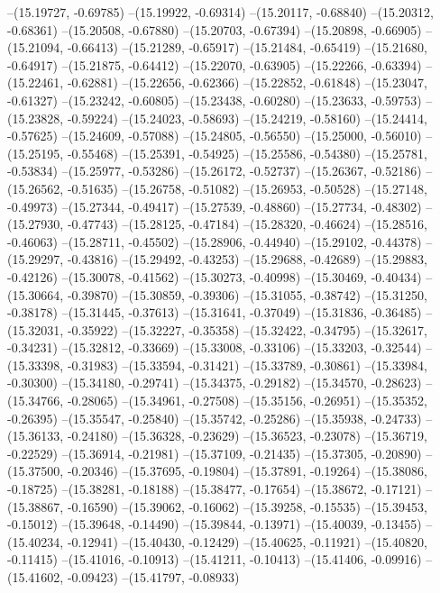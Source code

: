 --(15.19727, -0.69785)
--(15.19922, -0.69314)
--(15.20117, -0.68840)
--(15.20312, -0.68361)
--(15.20508, -0.67880)
--(15.20703, -0.67394)
--(15.20898, -0.66905)
--(15.21094, -0.66413)
--(15.21289, -0.65917)
--(15.21484, -0.65419)
--(15.21680, -0.64917)
--(15.21875, -0.64412)
--(15.22070, -0.63905)
--(15.22266, -0.63394)
--(15.22461, -0.62881)
--(15.22656, -0.62366)
--(15.22852, -0.61848)
--(15.23047, -0.61327)
--(15.23242, -0.60805)
--(15.23438, -0.60280)
--(15.23633, -0.59753)
--(15.23828, -0.59224)
--(15.24023, -0.58693)
--(15.24219, -0.58160)
--(15.24414, -0.57625)
--(15.24609, -0.57088)
--(15.24805, -0.56550)
--(15.25000, -0.56010)
--(15.25195, -0.55468)
--(15.25391, -0.54925)
--(15.25586, -0.54380)
--(15.25781, -0.53834)
--(15.25977, -0.53286)
--(15.26172, -0.52737)
--(15.26367, -0.52186)
--(15.26562, -0.51635)
--(15.26758, -0.51082)
--(15.26953, -0.50528)
--(15.27148, -0.49973)
--(15.27344, -0.49417)
--(15.27539, -0.48860)
--(15.27734, -0.48302)
--(15.27930, -0.47743)
--(15.28125, -0.47184)
--(15.28320, -0.46624)
--(15.28516, -0.46063)
--(15.28711, -0.45502)
--(15.28906, -0.44940)
--(15.29102, -0.44378)
--(15.29297, -0.43816)
--(15.29492, -0.43253)
--(15.29688, -0.42689)
--(15.29883, -0.42126)
--(15.30078, -0.41562)
--(15.30273, -0.40998)
--(15.30469, -0.40434)
--(15.30664, -0.39870)
--(15.30859, -0.39306)
--(15.31055, -0.38742)
--(15.31250, -0.38178)
--(15.31445, -0.37613)
--(15.31641, -0.37049)
--(15.31836, -0.36485)
--(15.32031, -0.35922)
--(15.32227, -0.35358)
--(15.32422, -0.34795)
--(15.32617, -0.34231)
--(15.32812, -0.33669)
--(15.33008, -0.33106)
--(15.33203, -0.32544)
--(15.33398, -0.31983)
--(15.33594, -0.31421)
--(15.33789, -0.30861)
--(15.33984, -0.30300)
--(15.34180, -0.29741)
--(15.34375, -0.29182)
--(15.34570, -0.28623)
--(15.34766, -0.28065)
--(15.34961, -0.27508)
--(15.35156, -0.26951)
--(15.35352, -0.26395)
--(15.35547, -0.25840)
--(15.35742, -0.25286)
--(15.35938, -0.24733)
--(15.36133, -0.24180)
--(15.36328, -0.23629)
--(15.36523, -0.23078)
--(15.36719, -0.22529)
--(15.36914, -0.21981)
--(15.37109, -0.21435)
--(15.37305, -0.20890)
--(15.37500, -0.20346)
--(15.37695, -0.19804)
--(15.37891, -0.19264)
--(15.38086, -0.18725)
--(15.38281, -0.18188)
--(15.38477, -0.17654)
--(15.38672, -0.17121)
--(15.38867, -0.16590)
--(15.39062, -0.16062)
--(15.39258, -0.15535)
--(15.39453, -0.15012)
--(15.39648, -0.14490)
--(15.39844, -0.13971)
--(15.40039, -0.13455)
--(15.40234, -0.12941)
--(15.40430, -0.12429)
--(15.40625, -0.11921)
--(15.40820, -0.11415)
--(15.41016, -0.10913)
--(15.41211, -0.10413)
--(15.41406, -0.09916)
--(15.41602, -0.09423)
--(15.41797, -0.08933)
